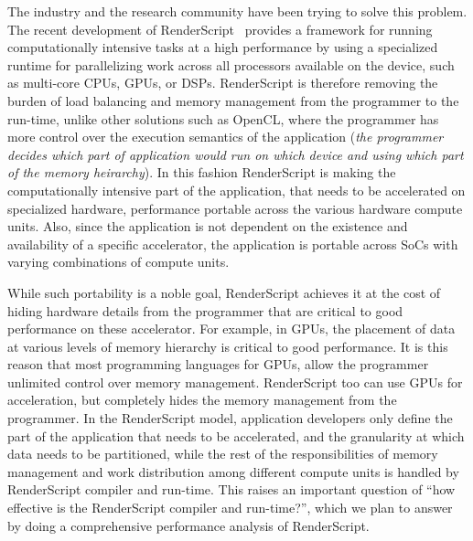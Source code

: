 The industry and the research community have been trying to solve this problem.
The recent development of RenderScript~\cite{wiki:RenderScript, RenderScript}
provides a framework
for running computationally intensive tasks at a high performance by using a
specialized runtime for 
parallelizing work across all processors available on the device, such as
multi-core CPUs, GPUs, or DSPs. RenderScript is therefore removing the
burden of load balancing and memory management from the programmer to the run-time, unlike other
solutions such as OpenCL, where the programmer has more control over the
execution semantics of the application ({\em the programmer decides which part
of application would run on which device and using which part of the memory heirarchy}).
In this fashion RenderScript is
making the computationally intensive part of the application, that needs to be
accelerated on specialized hardware, performance portable across the various hardware compute
units. Also, since the application is not dependent on the existence and
availability of a specific accelerator, the application is portable across SoCs
with varying combinations of compute units.

While such portability is a noble goal, RenderScript achieves it at the cost of
hiding hardware details from the programmer that are critical to good
performance on these accelerator. For example, in GPUs, the placement of data at
various levels of memory hierarchy is critical to good performance.
It is this reason that most programming languages for GPUs, allow the programmer
unlimited control over memory management. RenderScript too can use GPUs for acceleration, but
completely hides the memory management from the programmer. In the RenderScript
model, application developers only define the part of the application that needs
to be accelerated, and the granularity at which data needs to be partitioned,
while the rest of the responsibilities of memory management and work distribution
among different compute units is handled by RenderScript compiler and run-time.
This raises an important
question of ``how effective is the RenderScript compiler and run-time?'', which
we plan to answer by doing a comprehensive performance analysis of RenderScript.


